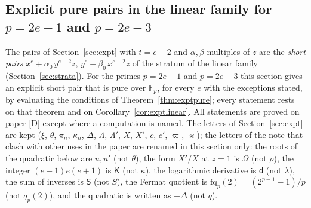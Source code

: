 \documentclass[11pt]{article}
\theoremstyle{definition}
\theoremstyle{remark}
\newcommand{\F}{\mathbb{F}}
\begin{document}
\subsection{Explicit pure pairs in the linear family for \texorpdfstring{$p=2e-1$}{p=2e-1} and \texorpdfstring{$p=2e-3$}{p=2e-3}}
\label{sec:exptexplicit}

The pairs of Section~\ref{sec:expt} with $t=e-2$ and $\alpha,\beta$ multiples of $z$ are the \emph{short pairs} $x^e+\alpha_0\,y^{e-2}z$, $y^e+\beta_0\,x^{e-2}z$ of the stratum of the linear family (Section~\ref{sec:strata}). For the primes $p=2e-1$ and $p=2e-3$ this section gives an explicit short pair that is pure over $\F_p$, for every $e$ with the exceptions stated, by evaluating the conditions of Theorem~\ref{thm:exptpure}; every statement rests on that theorem and on Corollary~\ref{cor:exptlinear}. All statements are proved on paper [D] except where a computation is named. The letters of Section~\ref{sec:expt} are kept ($\xi$, $\theta$, $\pi_n$, $\kappa_n$, $\Delta$, $\Lambda$, $\Lambda'$, $X$, $X'$, $c$, $c'$, $\varpi$, $\varkappa$); the letters of the note that clash with other uses in the paper are renamed in this section only: the roots of the quadratic below are $u,u'$ (not $\theta$), the form $X'/X$ at $z=1$ is $\Omega$ (not $\rho$), the integer $(e-1)e(e+1)$ is $\mathsf K$ (not $\kappa$), the logarithmic derivative is $\mathsf d$ (not $\lambda$), the sum of inverses is $\mathsf S$ (not $S$), the Fermat quotient is $\mathrm{fq}_p(2)=(2^{p-1}-1)/p$ (not $q_p(2)$), and the quadratic is written as $-\Delta$ (not $q$).
\end{document}
